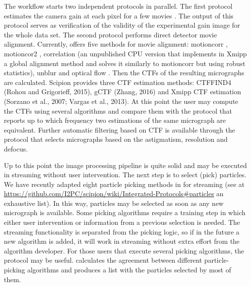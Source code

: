 The workflow starts two independent protocols in parallel. The first protocol estimates the camera gain at each pixel for a few  movies \citep{sorzano2018}. %
The output of this protocol serves as verification of the validity of the experimental gain image for the whole data set. The second protocol performs direct detector movie alignment. Currently, \scipion offers  five  methods for movie alignment: motioncorr \citep{Li2015}, motioncor2 \citep{Zheng2016:motioncor2}, correlation (an unpublished CPU version that implements in Xmipp a global alignment method and solves it similarly to motioncorr but using robust statistics), unblur \citep{Grant2015:unblur} and optical flow \citep{Abrishami2015:optical-flow}. Then the CTFs of the resulting micrographs are calculated. Scipion provides three CTF estimation methods:
CTFFIND4 (Rohou and Grigorieff, 2015), gCTF (Zhang, 2016) and Xmipp CTF estimation (Sorzano et al., 2007; Vargas et al., 2013). At this point the user may compute the CTFs using several algorithms and compare them with the protocol  that reports up to which frequency two estimations of the same micrograph are equivalent. Further automatic filtering based on CTF is available through the protocol  that selects micrographs based on the astigmatism, resolution and defocus. %

Up to this point the image processing pipeline is quite solid and may be executed in streaming without user intervention. The next step is to select (pick) particles. We have recently adapted eight particle picking methods in \scipion  for streaming (see at \url{https://github.com/I2PC/scipion/wiki/Integrated-Protocols#particles} an exhaustive list). In this way,  particles may be selected as soon as any new micrograph is available. Some picking algorithms require a training step in which either user intervention or information from a previous selection is needed. The streaming functionality is separated from the picking logic, so if in the future a new algorithm is added, it will work in streaming without extra effort from the algorithm developer. For those users that execute several picking algorithms, the protocol  may be useful.   calculates the agreement between different particle-picking algorithms and produces a list with the particles selected by most of them.

